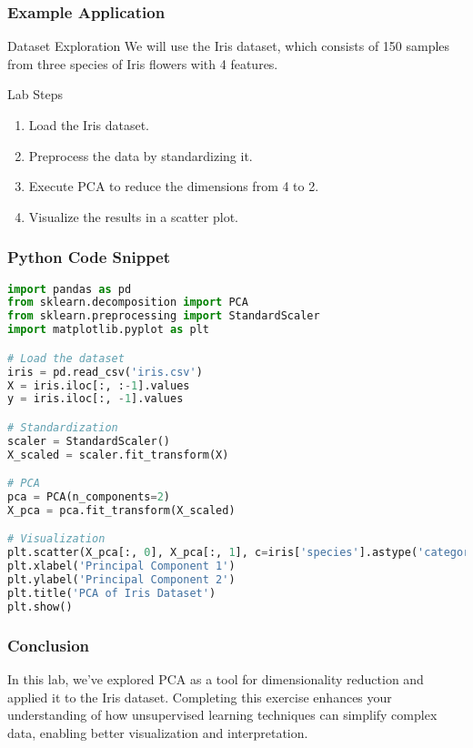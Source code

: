 \documentclass[aspectratio=169]{beamer}
\begin{document}
\begin{frame}
    \frametitle{Example Application}
    \begin{block}{Dataset Exploration}
        We will use the Iris dataset, which consists of 150 samples from three species of Iris flowers with 4 features.
    \end{block}

    \begin{block}{Lab Steps}
        \begin{enumerate}
            \item Load the Iris dataset.
            \item Preprocess the data by standardizing it.
            \item Execute PCA to reduce the dimensions from 4 to 2.
            \item Visualize the results in a scatter plot.
        \end{enumerate}
    \end{block}
\end{frame}

\begin{frame}[fragile]
    \frametitle{Python Code Snippet}
    \begin{lstlisting}[language=Python]
import pandas as pd
from sklearn.decomposition import PCA
from sklearn.preprocessing import StandardScaler
import matplotlib.pyplot as plt

# Load the dataset
iris = pd.read_csv('iris.csv')
X = iris.iloc[:, :-1].values
y = iris.iloc[:, -1].values

# Standardization
scaler = StandardScaler()
X_scaled = scaler.fit_transform(X)

# PCA
pca = PCA(n_components=2)
X_pca = pca.fit_transform(X_scaled)

# Visualization
plt.scatter(X_pca[:, 0], X_pca[:, 1], c=iris['species'].astype('category').cat.codes)
plt.xlabel('Principal Component 1')
plt.ylabel('Principal Component 2')
plt.title('PCA of Iris Dataset')
plt.show()
    \end{lstlisting}
\end{frame}

\begin{frame}
    \frametitle{Conclusion}
    In this lab, we've explored PCA as a tool for dimensionality reduction and applied it to the Iris dataset. Completing this exercise enhances your understanding of how unsupervised learning techniques can simplify complex data, enabling better visualization and interpretation.
\end{frame}
\end{document}
